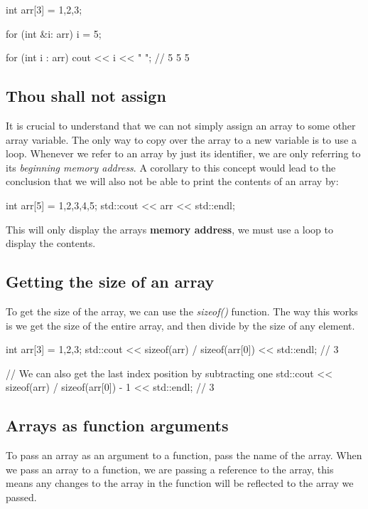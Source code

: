 \documentclass{report}
\begin{document}
   \begin{cppcode}
int arr[3] = {1,2,3};

for (int &i: arr)  {
    i = 5;
}

for (int i : arr) cout << i << " "; // 5 5 5
   \end{cppcode}
   

   \bigbreak \noindent 
   \subsection{Thou shall not assign}
   \bigbreak \noindent 
   It is crucial to understand  that we can not simply assign an array to some other array variable. The only way to copy over the array to a new variable is to use a loop. Whenever we refer to an array by just its identifier, we are only referring to its \textit{beginning memory address}.
   \bigbreak \noindent 
   A corollary to this concept would lead to the conclusion that we will also not be able to print the contents of an array by:
   \bigbreak \noindent 
   
   \begin{cppcode}
int arr[5] = {1,2,3,4,5};
std::cout << arr << std::endl;

   \end{cppcode}
   
   \bigbreak \noindent 
   This will only display the arrays \textbf{memory address}, we must use a loop to display the contents.

   \pagebreak
   \subsection{Getting the size of an array}
   \bigbreak \noindent 
   To get the size of the array, we can use the \textit{sizeof()} function. The way this works is we get the size of the entire array, and then divide by the size of any element.
   \bigbreak \noindent 
    
    \begin{cppcode}
int arr[3] = {1,2,3};
std::cout << sizeof(arr) / sizeof(arr[0]) << std::endl;  // 3

// We can also get the last index position by subtracting one
    std::cout << sizeof(arr) / sizeof(arr[0]) - 1 << std::endl;  // 3
    \end{cppcode}
    
    \bigbreak \noindent 

    \bigbreak \noindent 
    \subsection{Arrays as function arguments}
    \bigbreak \noindent 
    \begin{concept}
  To pass an array as an argument to a function, pass the name of the array. When we pass an array to a function, we are passing a reference to the array, this means any changes to the array in the function will be reflected to the array we passed.
	\end{concept}
    \bigbreak \noindent 
    
\end{document}
